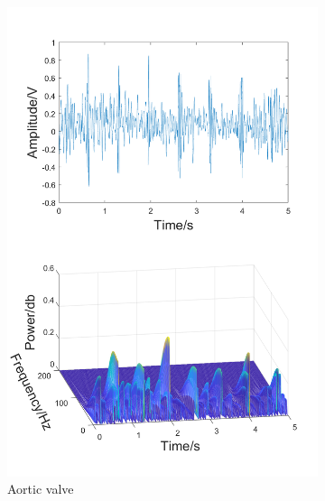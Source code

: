 \begin{figure}[htbp]
\begin{subfigure}{.3\linewidth}
        \label{FIG:Time&Frequency.a}
    \end{subfigure}\hfill
    \begin{subfigure}{.3\linewidth}
        \centering
        \includegraphics[width=1\linewidth]{figs/disscussion/b.png}
        \caption{Aortic valve}
        \label{FIG:Time&Frequency.b}
    \end{subfigure}\hfill
    \begin{subfigure}{.3\linewidth}
        \centering

\end{subfigure}
\end{figure}
